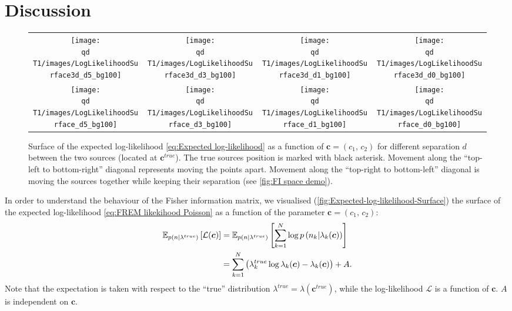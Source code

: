 \section{Discussion\label{sec:FREM discussion}}
\begin{figure}[thb]
	\centering
	\newcommand{\sizeff}{.18}
	\newcommand{\sizegg}{.16}	
	\begin{tabular}{cccc}
		\subfloat[$d=5$]{\texttt{[image: \\qd T1/images/LogLikelihoodSurface3d\_d5\_bg100]}} 
		
		& \subfloat[$d=3$]{\texttt{[image: \\qd T1/images/LogLikelihoodSurface3d\_d3\_bg100]}}
		
		& \subfloat[$d=1$]{\texttt{[image: \\qd T1/images/LogLikelihoodSurface3d\_d1\_bg100]}}
		
		& \subfloat[$d=0$]{\texttt{[image: \\qd T1/images/LogLikelihoodSurface3d\_d0\_bg100]}}
		
		\tabularnewline
		\subfloat[$d=5$]{\texttt{[image: \\qd T1/images/LogLikelihoodSurface\_d5\_bg100]}}
		
		& \subfloat[$d=3$]{\texttt{[image: \\qd T1/images/LogLikelihoodSurface\_d3\_bg100]}}
		
		& \subfloat[$d=1$]{\texttt{[image: \\qd T1/images/LogLikelihoodSurface\_d1\_bg100]}}
		
		& \subfloat[$d=0$]{\texttt{[image: \\qd T1/images/LogLikelihoodSurface\_d0\_bg100]}}
		
		\tabularnewline
	\end{tabular}
	\caption{Surface of the expected log-likelihood \autoref{eq:Expected log-likelihood} as a function of $\bm{c}=(c_1,\, c_2)$ for different separation $d$ between the two sources (located at $\bm{c}^{true}$). The true sources position is marked with black asterisk. Movement along the ``top-left to bottom-right'' diagonal represents moving the points apart. Movement along the ``top-right to bottom-left'' diagonal is moving the sources together while keeping their separation (see \autoref{fig:FI space demo}).}	
	\label{fig:Expected-log-likelihood-Surface}
\end{figure}

In order to understand the behaviour of the Fisher information matrix, we visualised (\autoref{fig:Expected-log-likelihood-Surface}) the surface of the expected log-likelihood \autoref{eq:FREM likekihood Poisson} as a function of the parameter $\bm{c}=(c_1,\, c_2)$: 
%
\begin{alignat}{2}
	\mathbb{E}_{p(n|\lambda^{true})}\left[\mathcal{L}(\bm{c})\right]&=\mathbb{E}_{p(n|\lambda^{true})}\left[\sum_{k=1}^N\log p\left(n_k|\lambda_k(\bm{c})\right)\right]\nonumber\\
	&=\sum_{k=1}^N\left(\lambda_k^{true}\log\lambda_k(\bm{c})-\lambda_k(\bm{c})\right)+A.
	\label{eq:Expected log-likelihood}
\end{alignat}
%
Note that the expectation is taken with respect to the ``true'' distribution $\lambda^{true}=\lambda(\bm{c}^{true})$, while the log-likelihood $\mathcal{L}$ is a function of $\bm{c}$. $A$ is independent on $\bm{c}$. 


